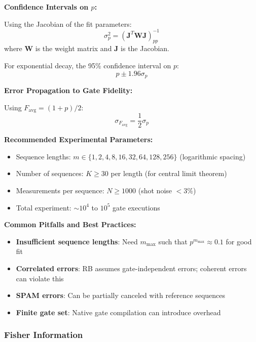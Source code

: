 \documentclass[11pt,a4paper]{article}
\theoremstyle{definition}
\theoremstyle{remark}
\begin{document}
\textbf{Confidence Intervals on $p$:}

Using the Jacobian of the fit parameters:
\begin{equation}
\sigma_p^2 = (\mathbf{J}^T \mathbf{W} \mathbf{J})^{-1}_{pp}
\end{equation}
where $\mathbf{W}$ is the weight matrix and $\mathbf{J}$ is the Jacobian.

For exponential decay, the 95\% confidence interval on $p$:
\begin{equation}
p \pm 1.96\sigma_p
\end{equation}

\textbf{Error Propagation to Gate Fidelity:}

Using $F_{\text{avg}} = (1+p)/2$:
\begin{equation}
\sigma_{F_{\text{avg}}} = \frac{1}{2}\sigma_p
\end{equation}

\textbf{Recommended Experimental Parameters:}

\begin{itemize}
    \item Sequence lengths: $m \in \{1, 2, 4, 8, 16, 32, 64, 128, 256\}$ (logarithmic spacing)
    \item Number of sequences: $K \geq 30$ per length (for central limit theorem)
    \item Measurements per sequence: $N \geq 1000$ (shot noise $< 3\%$)
    \item Total experiment: $\sim 10^4$ to $10^5$ gate executions
\end{itemize}

\textbf{Common Pitfalls and Best Practices:}

\begin{itemize}
    \item \textbf{Insufficient sequence lengths}: Need $m_{\max}$ such that $p^{m_{\max}} \approx 0.1$ for good fit
    \item \textbf{Correlated errors}: RB assumes gate-independent errors; coherent errors can violate this
    \item \textbf{SPAM errors}: Can be partially canceled with reference sequences
    \item \textbf{Finite gate set}: Native gate compilation can introduce overhead
\end{itemize}

\subsubsection{Fisher Information}
\end{document}
